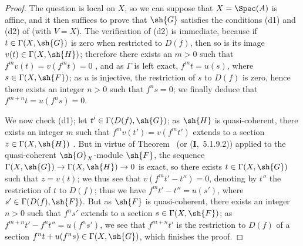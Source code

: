 \begin{proof}
The question is local on $X$, so we can suppose that $X=\Spec(A)$ is affine, and it then suffices to prove that $\sh{G}$ satisfies the conditions (d1) and (d2) of  (with $V=X$).
The verification of (d2) is immediate, because if $t\in\Gamma(X,\sh{G})$ is zero when restricted to $D(f)$, then so is its image $v(t)\in\Gamma(X,\sh{H})$; therefore there exists an $m>0$ such that $f^m v(t)=v(f^m t)=0$ , and as $\Gamma$ is left exact, $f^m t=u(s)$, where $s\in\Gamma(X,\sh{F})$; as $u$ is injective, the restriction of $s$ to $D(f)$ is zero, hence  there exists an integer $n>0$ such that $f^n s=0$; we finally deduce that $f^{m+n}t=u(f^n s)=0$.

We now check (d1); let $t'\in\Gamma(D(f),\sh{G})$; as $\sh{H}$ is quasi-coherent, there exists an integer $m$ such that $f^m v(t')=v(f^m t')$ extends to a section $z\in\Gamma(X,\sh{H})$ .
But in virtue of Theorem~ (or (\textbf{I},~5.1.9.2)) applied to the quasi-coherent $\sh{O}_X$-module $\sh{F}$, the sequence $\Gamma(X,\sh{G})\to\Gamma(X,\sh{H})\to 0$ is exact, so there exists $t\in\Gamma(X,\sh{G})$ such that $z=v(t)$; we thus see that $v(f^m t'-t'')=0$, denoting by $t''$ the restriction of $t$ to $D(f)$; thus we have $f^m t'-t''=u(s')$, where $s'\in\Gamma(D(f),\sh{F})$.
But as $\sh{F}$ is quasi-coherent, there exists an integer $n>0$ such that $f^n s'$ extends to a section $s\in\Gamma(X,\sh{F})$; as $f^{m+n}t'-f^n t''=u(f^n s')$, we see that $f^{m+n}t'$ is the restriction to $D(f)$ of a section $f^n t+u(f^n s)\in\Gamma(X,\sh{G})$, which finishes the proof.
\end{proof}
